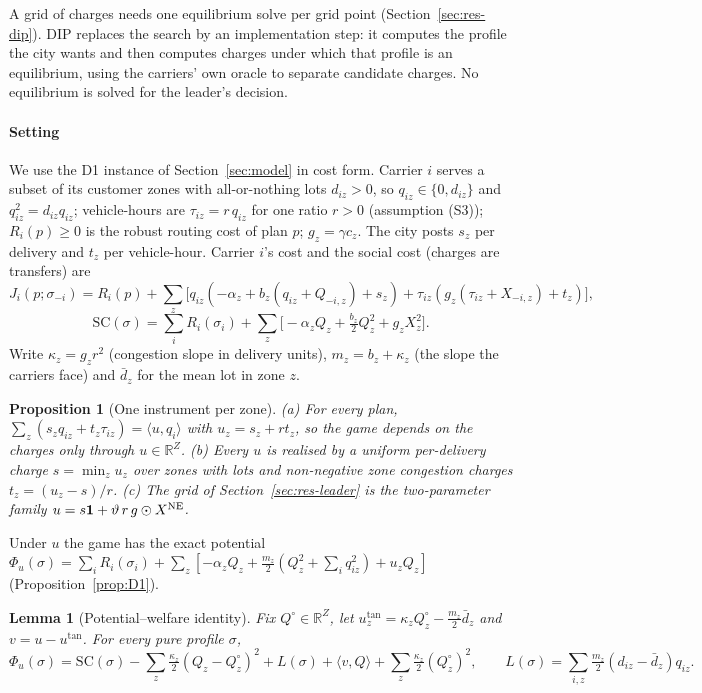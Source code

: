 \documentclass[preprint,12pt]{elsarticle}
\newtheorem{lemma}[theorem]{Lemma}
\newtheorem{proposition}[theorem]{Proposition}
\theoremstyle{definition}
\theoremstyle{remark}
\newcommand{\R}{\mathbb{R}}
\newcommand{\ip}[2]{\langle #1,#2\rangle}
\begin{document}
A grid of charges needs one equilibrium solve per grid point (Section~\ref{sec:res-dip}). DIP replaces the search by an implementation step: it computes the profile the city wants and then computes charges under which that profile is an equilibrium, using the carriers' own oracle to separate candidate charges. No equilibrium is solved for the leader's decision.

\paragraph{Setting} We use the D1 instance of Section~\ref{sec:model} in cost form. Carrier $i$ serves a subset of its customer zones with all-or-nothing lots $d_{iz}>0$, so $q_{iz}\in\{0,d_{iz}\}$ and $q_{iz}^2=d_{iz}q_{iz}$; vehicle-hours are $\tau_{iz}=r\,q_{iz}$ for one ratio $r>0$ (assumption (S3)); $R_i(p)\ge0$ is the robust routing cost of plan $p$; $g_z=\gamma c_z$. The city posts $s_z$ per delivery and $t_z$ per vehicle-hour. Carrier $i$'s cost and the social cost (charges are transfers) are
\[
J_i(p;\sigma_{-i})=R_i(p)+\sum_z\big[q_{iz}(-\alpha_z+b_z(q_{iz}+Q_{-i,z})+s_z)+\tau_{iz}(g_z(\tau_{iz}+X_{-i,z})+t_z)\big],
\]
\[
\mathrm{SC}(\sigma)=\sum_iR_i(\sigma_i)+\sum_z\big[-\alpha_zQ_z+\tfrac{b_z}{2}Q_z^2+g_zX_z^2\big].
\]
Write $\kappa_z=g_zr^2$ (congestion slope in delivery units), $m_z=b_z+\kappa_z$ (the slope the carriers face) and $\bar d_z$ for the mean lot in zone $z$.

\begin{proposition}[One instrument per zone]\label{prop:instr}
(a) For every plan, $\sum_z(s_zq_{iz}+t_z\tau_{iz})=\ip{u}{q_i}$ with $u_z=s_z+rt_z$, so the game depends on the charges only through $u\in\R^Z$. (b) Every $u$ is realised by a uniform per-delivery charge $s=\min_zu_z$ over zones with lots and non-negative zone congestion charges $t_z=(u_z-s)/r$. (c) The grid of Section~\ref{sec:res-leader} is the two-parameter family $u=s\mathbf 1+\vartheta\,r\,g\odot X^{\rm NE}$.
\end{proposition}

Under $u$ the game has the exact potential $\Phi_u(\sigma)=\sum_iR_i(\sigma_i)+\sum_z[-\alpha_zQ_z+\tfrac{m_z}{2}(Q_z^2+\sum_iq_{iz}^2)+u_zQ_z]$ (Proposition~\ref{prop:D1}).

\begin{lemma}[Potential--welfare identity]\label{lem:identity}
Fix $Q^\circ\in\R^Z$, let $u^{\tan}_z=\kappa_zQ^\circ_z-\tfrac{m_z}{2}\bar d_z$ and $v=u-u^{\tan}$. For every pure profile $\sigma$,
\[
\Phi_u(\sigma)=\mathrm{SC}(\sigma)-\sum_z\tfrac{\kappa_z}{2}(Q_z-Q^\circ_z)^2+L(\sigma)+\ip{v}{Q}+\sum_z\tfrac{\kappa_z}{2}(Q^\circ_z)^2,\qquad L(\sigma)=\sum_{i,z}\tfrac{m_z}{2}(d_{iz}-\bar d_z)q_{iz}.
\]
\end{lemma}
\end{document}
